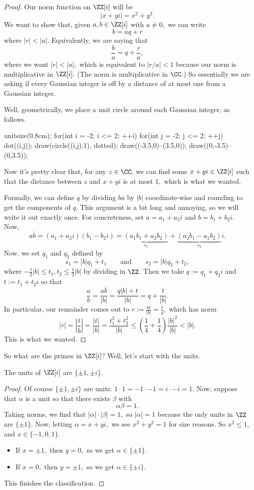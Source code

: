 \begin{proof}
	Our norm function on $\ZZ[i]$ will be
	\[|x+yi|=x^2+y^2.\]
	We want to show that, given $a,b\in\ZZ[i]$ with $a\ne0,$ we can write
	\[b=aq+r\]
	where $|r|<|a|.$ Equivalently, we are saying that
	\[\frac ba=q+\frac ra,\]
	where we want $|r|<|a|,$ which is equivalent to $|r/a|<1$ because our norm is multiplicative in $\ZZ[i].$ (The norm is multiplicative in $\CC.$) So essentially we are asking if every Gaussian integer is off by a distance of at most one from a Gaussian integer.

	Well, geometrically, we place a unit circle around each Gaussian integer, as follows.
	\begin{center}
		\begin{asy}
			unitsize(0.8cm);
			for(int i = -2; i <= 2; ++i)
			{
				for(int j = -2; j <= 2; ++j)
				{
					dot((i,j));
					draw(circle((i,j),1), dotted);
				}
			}
			draw((-3.5,0)--(3.5,0));
			draw((0,-3.5)--(0,3.5));
		\end{asy}
	\end{center}
	Now it's pretty clear that, for any $z\in\CC,$ we can find some $x+yi\in\ZZ[i]$ such that the distance between $z$ and $x+yi$ is at most $1,$ which is what we wanted.
	
	Formally, we can define $q$ by dividing $b\overline a$ by $|b|$ coordinate-wise and rounding to get the components of $q.$ This argument is a bit long and annoying, so we will write it out exactly once. For concreteness, set $a=a_1+a_2i$ and $b=b_1+b_2i.$ Now,
	\[a\overline b=(a_1+a_2i)(b_1-b_2i)=\underbrace{(a_1b_1+a_2b_2)}_{s_1}+\underbrace{(a_2b_1-a_1b_2)}_{s_2}i.\]
	Now, we set $q_1$ and $q_2$ defined by
	\[s_1=|b|q_1+t_1\qquad\text{and}\qquad s_2=|b|q_2+t_2,\]
	where $-\frac12|b|\le t_1,t_2\le\frac12|b|$ by dividing in $\ZZ.$ Then we take $q:=q_1+q_2i$ and $t:=t_1+t_2i$ so that
	\[\frac ab=\frac{a\overline b}{|b|}=\frac{q|b|+t}{|b|}=q+\frac t{|b|}.\]
	In particular, our remainder comes out to $r:=\frac{b t}{|b|}=\frac t{\overline b},$ which has norm
	\[|r|=\left|\frac{t}{\overline b}\right|=\frac{|t|}{|b|}=\frac{t_1^2+t_2^2}{|b|}\le\left(\frac14+\frac14\right)\frac{|b|^2}{|b|}<|b|.\]
	This is what we wanted.
\end{proof}
So what are the primes in $\ZZ[i]$? Well, let's start with the units.
\begin{proposition}
	The units of $\ZZ[i]$ are $\{\pm1,\pm i\}.$
\end{proposition}
\begin{proof}
	Of course $\{\pm1,\pm i\}$ are units: $1\cdot1=-1\cdot-1=i\cdot-i=1.$ Now, suppose that $\alpha$ is a unit so that there exists $\beta$ with
	\[\alpha\beta=1.\]
	Taking norms, we find that $|\alpha|\cdot|\beta|=1,$ so $|\alpha|=1$ because the only units in $\ZZ$ are $\{\pm1\}.$ Now, letting $\alpha=x+yi,$ we see $x^2+y^2=1$ for size reasons. So $x^2\le1,$ and $x\in\{-1,0,1\}.$
	\begin{itemize}
		\item If $x=\pm1,$ then $y=0,$ so we get $\alpha\in\{\pm1\}.$
		\item If $x=0,$ then $y=\pm1,$ so we get $\alpha\in\{\pm i\}.$
	\end{itemize}
	This finishes the classification.
\end{proof}
